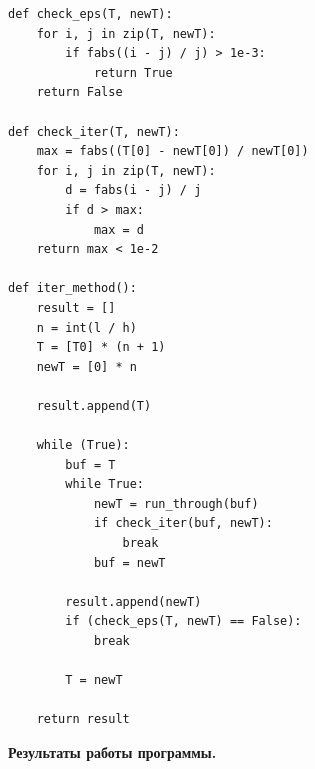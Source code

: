 \documentclass[a4paper,14pt]{extreport} %
\begin{document}
\begin{lstlisting}[caption=Метод простых итераций]
def check_eps(T, newT):
    for i, j in zip(T, newT):
        if fabs((i - j) / j) > 1e-3:
            return True
    return False

def check_iter(T, newT):
    max = fabs((T[0] - newT[0]) / newT[0])
    for i, j in zip(T, newT):
        d = fabs(i - j) / j
        if d > max:
            max = d
    return max < 1e-2

def iter_method():
    result = []
    n = int(l / h)
    T = [T0] * (n + 1)
    newT = [0] * n
    
    result.append(T)

    while (True):
        buf = T
        while True:
            newT = run_through(buf)
            if check_iter(buf, newT):
                break
            buf = newT

        result.append(newT)
        if (check_eps(T, newT) == False):
            break

        T = newT

    return result
\end{lstlisting}
\newpage 
\textbf{Результаты работы программы. }
\end{document}
